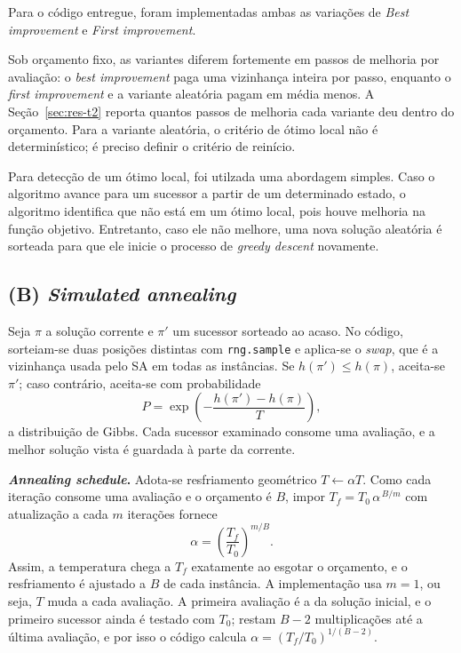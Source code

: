 Para o código entregue, foram implementadas ambas as variações de \textit{Best improvement} e \textit{First improvement}.

Sob orçamento fixo, as variantes diferem fortemente em passos de melhoria por avaliação: o \textit{best improvement} paga uma vizinhança inteira por passo, enquanto o \textit{first improvement} e a variante aleatória pagam em média menos. A Seção~\ref{sec:res-t2} reporta quantos passos de melhoria cada variante deu dentro do orçamento. Para a variante aleatória, o critério de ótimo local não é determinístico; é preciso definir o critério de reinício.

Para detecção de um ótimo local, foi utilzada uma abordagem simples. Caso o algoritmo avance para um sucessor a partir de um determinado estado, o algoritmo identifica que não está em um ótimo local, pois houve melhoria na função objetivo. Entretanto, caso ele não melhore, uma nova solução aleatória é sorteada para que ele inicie o processo de \textit{greedy descent} novamente.

\subsection{(B) \textit{Simulated annealing}}\label{sec:sa}

Seja $\pi$ a solução corrente e $\pi'$ um sucessor sorteado ao acaso. No código, sorteiam-se duas posições distintas com \texttt{rng.sample} e aplica-se o \textit{swap}, que é a vizinhança usada pelo SA em todas as instâncias. Se $h(\pi')\le h(\pi)$, aceita-se $\pi'$; caso contrário, aceita-se com probabilidade
\begin{equation}
  P=\exp\!\left(-\frac{h(\pi')-h(\pi)}{T}\right),
  \label{eq:gibbs}
\end{equation}
a distribuição de Gibbs. Cada sucessor examinado consome uma avaliação, e a melhor solução vista é guardada à parte da corrente.

\textbf{\textit{Annealing schedule}.} Adota-se resfriamento geométrico $T\leftarrow\alpha T$. Como cada iteração consome uma avaliação e o orçamento é $B$, impor $T_f=T_0\,\alpha^{\,B/m}$ com atualização a cada $m$ iterações fornece
\begin{equation}
  \alpha=\left(\frac{T_f}{T_0}\right)^{m/B}.
  \label{eq:alpha}
\end{equation}
Assim, a temperatura chega a $T_f$ exatamente ao esgotar o orçamento, e o resfriamento é ajustado a $B$ de cada instância. A implementação usa $m=1$, ou seja, $T$ muda a cada avaliação. A primeira avaliação é a da solução inicial, e o primeiro sucessor ainda é testado com $T_0$; restam $B-2$ multiplicações até a última avaliação, e por isso o código calcula $\alpha=(T_f/T_0)^{1/(B-2)}$.


